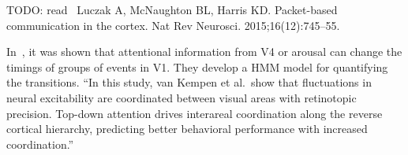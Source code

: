 \documentclass[brainsci, %
               review,submit,pdftex,moreauthors%
               ]{Definitions/mdpi}
\begin{document}
TODO: read~\citep{luczak_packet-based_2015} Luczak A, McNaughton BL, Harris KD. Packet-based communication in the cortex. Nat Rev Neurosci. 2015;16(12):745--55.

In~\citep{van_kempen_top-down_2021}, it was shown that attentional information from V4 or arousal can change the timings of groups of events in V1. They develop a HMM model for quantifying the transitions. ``In this study, van Kempen et al.~show that fluctuations in neural excitability are coordinated between visual areas with retinotopic precision. Top-down attention drives interareal coordination along the reverse cortical hierarchy, predicting better behavioral performance with increased coordination.''

\end{document}
